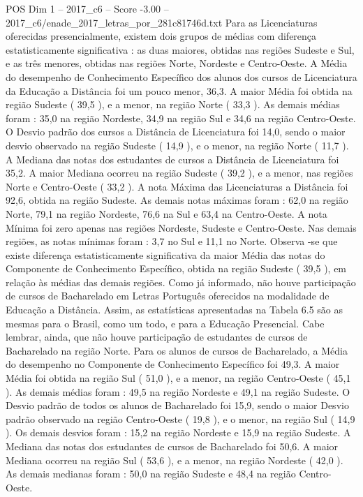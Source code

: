 \begin{textsample}{POS Dim 1 – 2017\_c6 – Score -3.00 – 2017\_c6/enade\_2017\_letras\_por\_281c81746d.txt}
Para as Licenciaturas oferecidas presencialmente, existem dois grupos de médias com diferença estatisticamente significativa : as duas maiores, obtidas nas regiões Sudeste e Sul, e as três menores, obtidas nas regiões Norte, Nordeste e Centro-Oeste.
A Média do desempenho de Conhecimento Específico dos alunos dos cursos de Licenciatura da Educação a Distância foi um pouco menor, 36,3.
A maior Média foi obtida na região Sudeste ( 39,5 ), e a menor, na região Norte ( 33,3 ).
As demais médias foram : 35,0 na região Nordeste, 34,9 na região Sul e 34,6 na região Centro-Oeste.
O Desvio padrão dos cursos a Distância de Licenciatura foi 14,0, sendo o maior desvio observado na região Sudeste ( 14,9 ), e o menor, na região Norte ( 11,7 ).
A Mediana das notas dos estudantes de cursos a Distância de Licenciatura foi 35,2.
A maior Mediana ocorreu na região Sudeste ( 39,2 ), e a menor, nas regiões Norte e Centro-Oeste ( 33,2 ).
A nota Máxima das Licenciaturas a Distância foi 92,6, obtida na região Sudeste.
As demais notas máximas foram : 62,0 na região Norte, 79,1 na região Nordeste, 76,6 na Sul e 63,4 na Centro-Oeste.
A nota Mínima foi zero apenas nas regiões Nordeste, Sudeste e Centro-Oeste.
Nas demais regiões, as notas mínimas foram : 3,7 no Sul e 11,1 no Norte.
Observa -se que existe diferença estatisticamente significativa da maior Média das notas do Componente de Conhecimento Específico, obtida na região Sudeste ( 39,5 ), em relação às médias das demais regiões.
Como já informado, não houve participação de cursos de Bacharelado em Letras Português oferecidos na modalidade de Educação a Distância.
Assim, as estatísticas apresentadas na Tabela 6.5 são as mesmas para o Brasil, como um todo, e para a Educação Presencial.
Cabe lembrar, ainda, que não houve participação de estudantes de cursos de Bacharelado na região Norte.
Para os alunos de cursos de Bacharelado, a Média do desempenho no Componente de Conhecimento Específico foi 49,3.
A maior Média foi obtida na região Sul ( 51,0 ), e a menor, na região Centro-Oeste ( 45,1 ).
As demais médias foram : 49,5 na região Nordeste e 49,1 na região Sudeste.
O Desvio padrão de todos os alunos de Bacharelado foi 15,9, sendo o maior Desvio padrão observado na região Centro-Oeste ( 19,8 ), e o menor, na região Sul ( 14,9 ).
Os demais desvios foram : 15,2 na região Nordeste e 15,9 na região Sudeste.
A Mediana das notas dos estudantes de cursos de Bacharelado foi 50,6.
A maior Mediana ocorreu na região Sul ( 53,6 ), e a menor, na região Nordeste ( 42,0 ).
As demais medianas foram : 50,0 na região Sudeste e 48,4 na região Centro-Oeste.

\end{textsample}
